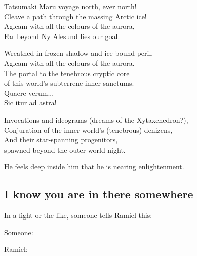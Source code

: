 \begin{garbage}
{  Tatsumaki Maru voyage north, ever north!\\
  Cleave a path through the massing Arctic ice!\\
  Agleam with all the colours of the aurora,\\
  Far beyond Ny Alesund lies our goal.
  
  Wreathed in frozen shadow and ice-bound peril.\\
  Agleam with all the colours of the aurora.\\
  The portal to the tenebrous cryptic core \\
  of this world's subterrene inner sanctums.\\
  Quaere verum... \\
  Sic itur ad astra!
  
  Invocations and ideograms (dreams of the Xytaxehedron?),\\
  Conjuration of the inner world's (tenebrous) denizens,\\
  And their star-spanning progenitors, \\
  spawned beyond the outer-world night.
}

He feels deep inside him that he is nearing enlightenment. 







\subsection{I know you are in there somewhere}
In a fight or the like, someone tells Ramiel this: 

\begin{prose}
  Someone: 
  
  Ramiel: 
\end{prose}








\end{garbage}
